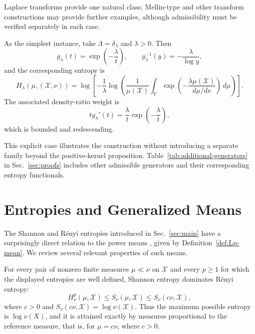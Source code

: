 \documentclass[reqno]{amsart}
\begin{document}
Laplace transforms provide one natural class;
Mellin-type and other transform constructions may provide further examples, although admissibility must be verified separately in each case.

As the simplest instance, take
$\Lambda=\delta_{\lambda}$ and $\lambda>0$. Then
$$
g_{\lambda}(t)
=
\exp\left(-\frac{\lambda}{t}\right),
\qquad
g_{\lambda}^{-1}(y)
=
-\frac{\lambda}{\log y},
$$
and the corresponding entropy is
$$
H_{\lambda}(\mu,(\mathcal{X},\nu))
=
\log
\left[
-\frac{1}{\lambda}
\log
\left(
\frac{1}{\mu(\mathcal{X})}
\int_Y
\exp\left(
-\frac{\lambda\mu(\mathcal{X})}
{d\mu/d\nu}
\right)
\,d\mu
\right)
\right].
$$
The associated density-ratio weight is
$$
t g_{\lambda}'(t)
=
\frac{\lambda}{t}
\exp\left(-\frac{\lambda}{t}\right),
$$
which is bounded and redescending.


This explicit case illustrates the construction without introducing a
separate family beyond the positive-kernel proposition.
Table~\ref{tab:additional-generators} in Sec.~\ref{sec:proofs} includes other admissible generators and their corresponding entropy functionals.






\section{Entropies and Generalized Means}

The Shannon and R\'enyi entropies introduced in Sec.~\ref{sec:main} have a surprisingly direct relation to the power means \cite{Kol30, Nagumo1930, Bullen2003,deCar16}, given by Definition~\ref{def:Lp-mean}. We review several relevant properties of such means.

\label{sec:ent-mean-lem}
\begin{lem}
\label{prop:ent-max}
For every pair of nonzero finite measures $\mu\ll\nu$ on $\mathcal{X}$ and every $p\geq1$ for which the displayed entropies are well defined, Shannon entropy dominates R\'enyi entropy: 
\begin{equation}
\label{ineq:ent-max}
 H^p_\nu(\mu,\mathcal{X})  \leq S_\nu(\mu,{\mathcal{X}}) \leq  S_\nu(c \nu,{\mathcal{X}}), 
\end{equation}
where $c>0$ and $S_\nu(c\nu,{\mathcal{X}}) = \log \nu(\mathcal{X})$. Thus the maximum possible entropy is  $\log\nu(X)$, and it is attained exactly by measures proportional to the reference measure, that is, for $\mu = c\nu$, where $c>0$.
\end{lem}
\end{document}
